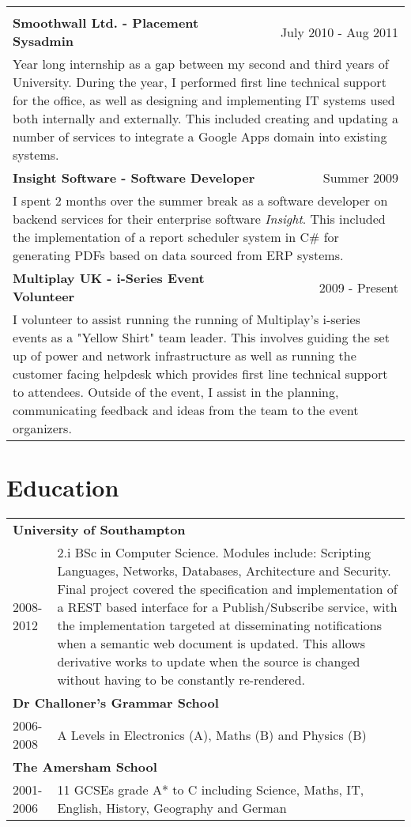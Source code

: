 \documentclass[11pt]{report}
\begin{document}
\begin{tabularx}{\textwidth}{l r}
{}
\\
\addlinespace
{\bf Smoothwall Ltd. - Placement Sysadmin} & July 2010 - Aug 2011 \\
\multicolumn{2}{X}{
Year long internship as a gap between my second and third years of University.
During the year, I performed first line technical support for the office, as well as designing and implementing IT systems used both internally and externally.
This included creating and updating a number of services to integrate a Google Apps domain into existing systems.
}
\\
\addlinespace
{\bf Insight Software - Software Developer} & Summer 2009 \\
\multicolumn{2}{X}{
I spent 2 months over the summer break as a software developer on backend services for their enterprise software {\it Insight}.
This included the implementation of a report scheduler system in C\# for generating PDFs based on data sourced from ERP systems.
}
\\
\addlinespace
{\bf Multiplay UK - i-Series Event Volunteer} & 2009 - Present \\
\multicolumn{2}{X}{
I volunteer to assist running the running of Multiplay's i-series events as a "Yellow Shirt" team leader.
This involves guiding the set up of power and network infrastructure as well as running the customer facing helpdesk which provides first line technical support to attendees.
Outside of the event, I assist in the planning, communicating feedback and ideas from the team to the event organizers.
}
\end{tabularx}
\section*{Education}
\begin{tabularx}{\textwidth}{ l X }
\multicolumn{2}{l}{\bf University of Southampton} \\
2008-2012 & 
2.i BSc in Computer Science.
Modules include: Scripting Languages, Networks, Databases, Architecture and Security.
Final project covered the specification and implementation of a REST based interface for a Publish/Subscribe service,
with the implementation targeted at disseminating notifications when a semantic web document is updated.
This allows derivative works to update when the source is changed without having to be constantly re-rendered.\\
\multicolumn{2}{l}{\bf Dr Challoner's Grammar School} \\
2006-2008 & A Levels in Electronics (A), Maths (B) and Physics (B) \\
\multicolumn{2}{l}{\bf The Amersham School} \\
2001-2006 & 11 GCSEs grade A* to C including Science, Maths, IT, English, History, Geography and German
\end{tabularx}
\newpage
\end{document}
